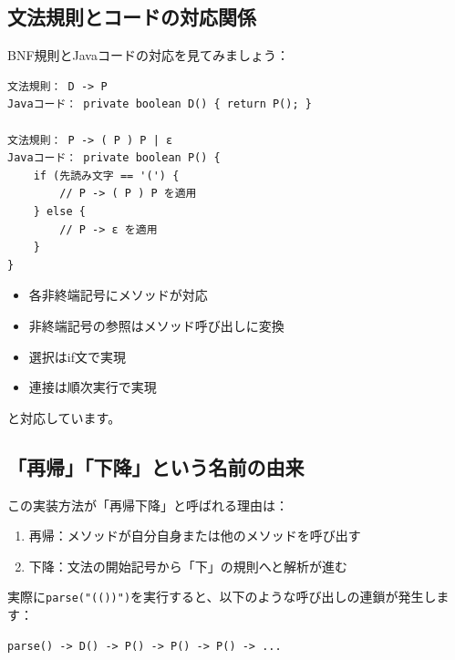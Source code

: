 \hypertarget{chapter5-ux6587ux6cd5ux898fux5247ux3068ux30b3ux30fcux30c9ux306eux5bfeux5fdcux95a2ux4fc2}{%
\subsection{文法規則とコードの対応関係}\label{chapter5-ux6587ux6cd5ux898fux5247ux3068ux30b3ux30fcux30c9ux306eux5bfeux5fdcux95a2ux4fc2}}

BNF規則とJavaコードの対応を見てみましょう：

\begin{verbatim}
文法規則： D -> P
Javaコード： private boolean D() { return P(); }

文法規則： P -> ( P ) P | ε
Javaコード： private boolean P() {
    if (先読み文字 == '(') {
        // P -> ( P ) P を適用
    } else {
        // P -> ε を適用
    }
}
\end{verbatim}

\begin{itemize}
\tightlist
\item
  各非終端記号にメソッドが対応
\item
  非終端記号の参照はメソッド呼び出しに変換
\item
  選択はif文で実現
\item
  連接は順次実行で実現
\end{itemize}

と対応しています。

\hypertarget{chapter5-ux518dux5e30ux4e0bux964dux3068ux3044ux3046ux540dux524dux306eux7531ux6765}{%
\subsection{「再帰」「下降」という名前の由来}\label{chapter5-ux518dux5e30ux4e0bux964dux3068ux3044ux3046ux540dux524dux306eux7531ux6765}}

この実装方法が「再帰下降」と呼ばれる理由は：

\begin{enumerate}
\def\labelenumi{\arabic{enumi}.}
\tightlist
\item
  再帰：メソッドが自分自身または他のメソッドを呼び出す
\item
  下降：文法の開始記号から「下」の規則へと解析が進む
\end{enumerate}

実際に\texttt{parse("(())")}を実行すると、以下のような呼び出しの連鎖が発生します：

\begin{verbatim}
parse() -> D() -> P() -> P() -> P() -> ...
\end{verbatim}

